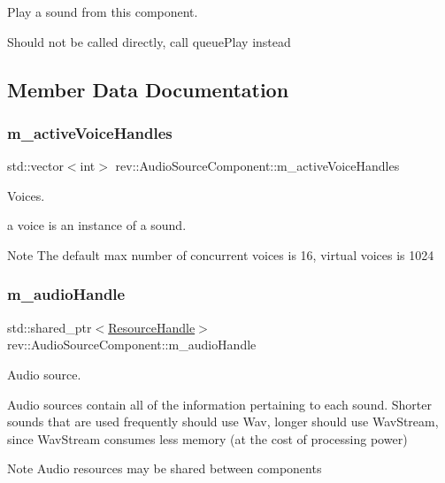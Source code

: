 Play a sound from this component. 

Should not be called directly, call queue\+Play instead 

\subsection{Member Data Documentation}
\mbox{\label{classrev_1_1_audio_source_component_a81e3ba07e63f3b54f907361d813e532b}} 
\subsubsection{\texorpdfstring{m\_activeVoiceHandles}{m\_activeVoiceHandles}}
{\footnotesize\ttfamily std\+::vector$<$int$>$ rev\+::\+Audio\+Source\+Component\+::m\+\_\+active\+Voice\+Handles\hspace{0.3cm}{\ttfamily [protected]}}



Voices. 

a voice is an instance of a sound. \begin{DoxyNote}{Note}
The default max number of concurrent voices is 16, virtual voices is 1024 
\end{DoxyNote}
\mbox{\label{classrev_1_1_audio_source_component_a908a35cf39a4e7b7dd096ead05aad22d}} 
\subsubsection{\texorpdfstring{m\_audioHandle}{m\_audioHandle}}
{\footnotesize\ttfamily std\+::shared\+\_\+ptr$<$\mbox{\hyperlink{classrev_1_1_resource_handle}{Resource\+Handle}}$>$ rev\+::\+Audio\+Source\+Component\+::m\+\_\+audio\+Handle\hspace{0.3cm}{\ttfamily [protected]}}



Audio source. 

Audio sources contain all of the information pertaining to each sound. Shorter sounds that are used frequently should use Wav, longer should use Wav\+Stream, since Wav\+Stream consumes less memory (at the cost of processing power) \begin{DoxyNote}{Note}
Audio resources may be shared between components 
\end{DoxyNote}
\mbox{\label{classrev_1_1_audio_source_component_aff77615a5b500bfc8efeb1d82ca7f923}} 
